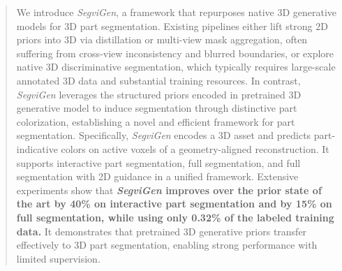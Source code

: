 \begin{abstract}
We introduce \textit{SegviGen}, a framework that repurposes native 3D generative models for 3D part segmentation. 
%
Existing pipelines either lift strong 2D priors into 3D via distillation or multi-view mask aggregation, 
%
often suffering from cross-view inconsistency and blurred boundaries, 
%
or explore native 3D discriminative segmentation, 
%
which typically requires large-scale annotated 3D data and substantial training resources.
%
In contrast, \textit{SegviGen} leverages the structured priors encoded in pretrained 3D generative model to induce segmentation through distinctive part colorization, establishing a novel and efficient framework for part segmentation.
%
Specifically, \textit{SegviGen} encodes a 3D asset and predicts part-indicative colors on active voxels of a geometry-aligned reconstruction. 
%
It supports interactive part segmentation, full segmentation, and full segmentation with 2D guidance in a unified framework.
%
Extensive experiments show that \textbf{\textit{SegviGen} improves over the prior state of the art by 40\% on interactive part segmentation and by 15\% on full segmentation, while using only 0.32\% of the labeled training data.}
%
It demonstrates that pretrained 3D generative priors transfer effectively to 3D part segmentation, enabling strong performance with limited supervision.
\end{abstract}